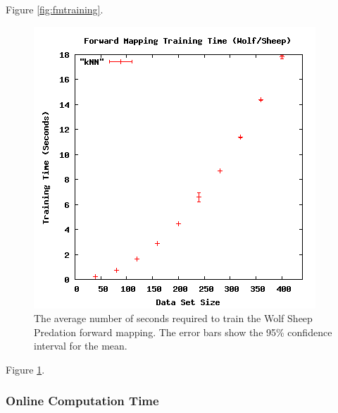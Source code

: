 Figure \ref{fig:fmtraining}.


\begin{figure}[ht]
\centering
\includegraphics[scale=.5]{images/results_wolfsheep/fm-training.png}
\caption{The average number of seconds required to train the Wolf Sheep Predation forward mapping.
The error bars show the 95\% confidence interval for the mean.}
\label{fig:wolfsheepfmtraining}
\end{figure}

Figure \ref{fig:wolfsheepfmtraining}.



  \subsubsection{Online Computation Time}

